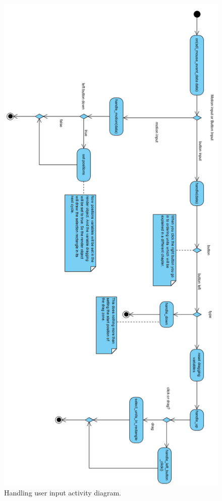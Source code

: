 \begin{figure}[!htb]
    \centering
    \includegraphics[scale=0.8]{res/ActivityDiagramMouseHandler180.png}
    \caption{Handling user input activity diagram.}\label{fig:activitymousehandler}
\end{figure}

